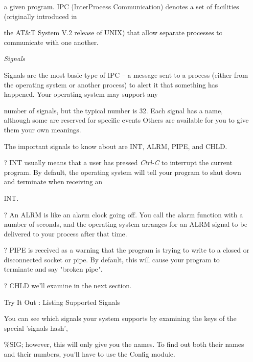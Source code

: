 \documentclass[a4paper,11pt]{book}
\begin{document}
\noindent a given program. IPC (InterProcess Communication) denotes a set of facilities (originally introduced in

\noindent the AT\&T System V.2 release of UNIX) that allow separate processes to communicate with one another.

\noindent 

\noindent \textit{Signals}

\noindent Signals are the most basic type of IPC -- a message sent to a process (either from the operating system or another process) to alert it that something has happened. Your operating system may support any

\noindent number of signals, but the typical number is 32. Each signal has a name, although some are reserved for specific events Others are available for you to give them your own meanings.

\noindent 

\noindent 

\noindent The important signals to know about are INT, ALRM, PIPE, and CHLD.

\noindent 

\noindent ? INT usually means that a user has pressed \textit{Ctrl-C }to interrupt the current program. By default, the operating system will tell your program to shut down and terminate when receiving an

\noindent INT.

\noindent 

\noindent ? An ALRM is like an alarm clock going off. You call the alarm function with a number of seconds, and the operating system arranges for an ALRM signal to be delivered to your process after that time.

\noindent 

\noindent ? PIPE is received as a warning that the program is trying to write to a closed or disconnected socket or pipe. By default, this will cause your program to terminate and say "broken pipe".

\noindent 

\noindent ? CHLD we'll examine in the next section.

\noindent 

\noindent 

\noindent Try It Out : Listing Supported Signals

\noindent You can see which signals your system supports by examining the keys of the special 'signals hash',

\noindent \%SIG; however, this will only give you the names. To find out both their names and their numbers, you'll have to use the Config module.
\end{document}
